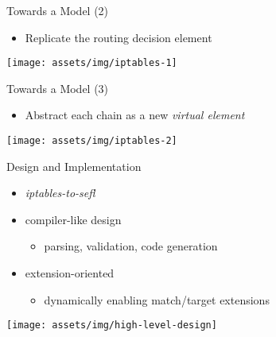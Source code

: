 \documentclass{beamer}
\begin{document}
\begin{frame}[t]{Towards a Model (2)}
  \begin{itemize}
    \item[2.] Replicate the routing decision element
  \end{itemize}

  \vspace*{0.8cm}

  \centering
  \texttt{[image: assets/img/iptables-1]}
\end{frame}

\begin{frame}[t]{Towards a Model (3)}
  \begin{itemize}
    \item[3.] Abstract each chain as a new \emph{virtual element}
  \end{itemize}

  \vspace*{0.8cm}

  \centering
  \texttt{[image: assets/img/iptables-2]}
\end{frame}

\begin{frame}{Design and Implementation}
  \begin{itemize}
    \item \emph{iptables-to-sefl}
    \item compiler-like design
      \begin{itemize}
        \item[--] parsing, validation, code generation
      \end{itemize}
    \item extension-oriented
      \begin{itemize}
        \item[--] dynamically enabling match/target extensions
      \end{itemize}
  \end{itemize}

  \centering
  \texttt{[image: assets/img/high-level-design]}
\end{frame}
\end{document}
